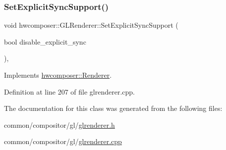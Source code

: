 \subsubsection{\texorpdfstring{Set\+Explicit\+Sync\+Support()}{SetExplicitSyncSupport()}}
{\footnotesize\ttfamily void hwcomposer\+::\+G\+L\+Renderer\+::\+Set\+Explicit\+Sync\+Support (\begin{DoxyParamCaption}\item[{bool}]{disable\+\_\+explicit\+\_\+sync }\end{DoxyParamCaption})\hspace{0.3cm}{\ttfamily [override]}, {\ttfamily [virtual]}}



Implements \mbox{\hyperlink{classhwcomposer_1_1Renderer_a8f889bf7b26aa7d1436e9ecf6d15e629}{hwcomposer\+::\+Renderer}}.



Definition at line 207 of file glrenderer.\+cpp.


\begin{DoxyCode}{0}
\end{DoxyCode}


The documentation for this class was generated from the following files\+:\begin{DoxyCompactItemize}
\item 
common/compositor/gl/\mbox{\hyperlink{glrenderer_8h}{glrenderer.\+h}}\item 
common/compositor/gl/\mbox{\hyperlink{glrenderer_8cpp}{glrenderer.\+cpp}}\end{DoxyCompactItemize}
